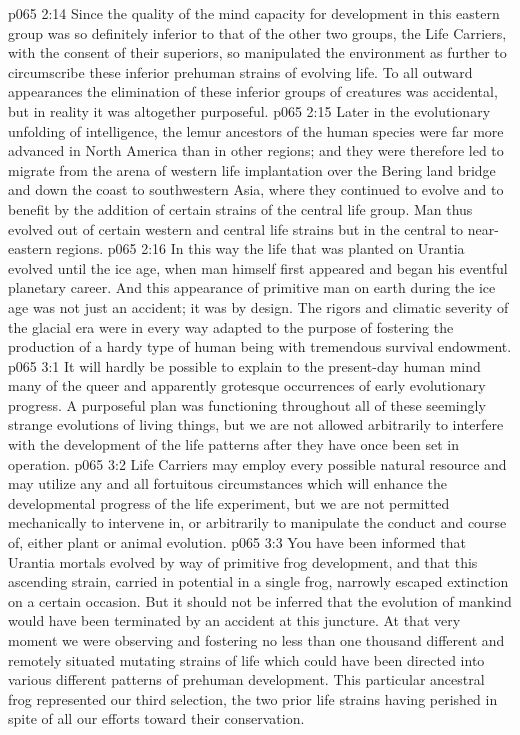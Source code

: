 \vs p065 2:14 Since the quality of the mind capacity for development in this eastern group was so definitely inferior to that of the other two groups, the Life Carriers, with the consent of their superiors, so manipulated the environment as further to circumscribe these inferior prehuman strains of evolving life. To all outward appearances the elimination of these inferior groups of creatures was accidental, but in reality it was altogether purposeful.
\vs p065 2:15 Later in the evolutionary unfolding of intelligence, the lemur ancestors of the human species were far more advanced in North America than in other regions; and they were therefore led to migrate from the arena of western life implantation over the Bering land bridge and down the coast to southwestern Asia, where they continued to evolve and to benefit by the addition of certain strains of the central life group. Man thus evolved out of certain western and central life strains but in the central to near\hyp{}eastern regions.
\vs p065 2:16 In this way the life that was planted on Urantia evolved until the ice age, when man himself first appeared and began his eventful planetary career. And this appearance of primitive man on earth during the ice age was not just an accident; it was by design. The rigors and climatic severity of the glacial era were in every way adapted to the purpose of fostering the production of a hardy type of human being with tremendous survival endowment.
\vs p065 3:1 It will hardly be possible to explain to the present\hyp{}day human mind many of the queer and apparently grotesque occurrences of early evolutionary progress. A purposeful plan was functioning throughout all of these seemingly strange evolutions of living things, but we are not allowed arbitrarily to interfere with the development of the life patterns after they have once been set in operation.
\pc \vs p065 3:2 Life Carriers may employ every possible natural resource and may utilize any and all fortuitous circumstances which will enhance the developmental progress of the life experiment, but we are not permitted mechanically to intervene in, or arbitrarily to manipulate the conduct and course of, either plant or animal evolution.
\vs p065 3:3 You have been informed that Urantia mortals evolved by way of primitive frog development, and that this ascending strain, carried in potential in a single frog, narrowly escaped extinction on a certain occasion. But it should not be inferred that the evolution of mankind would have been terminated by an accident at this juncture. At that very moment we were observing and fostering no less than one thousand different and remotely situated mutating strains of life which could have been directed into various different patterns of prehuman development. This particular ancestral frog represented our third selection, the two prior life strains having perished in spite of all our efforts toward their conservation.\plusone
